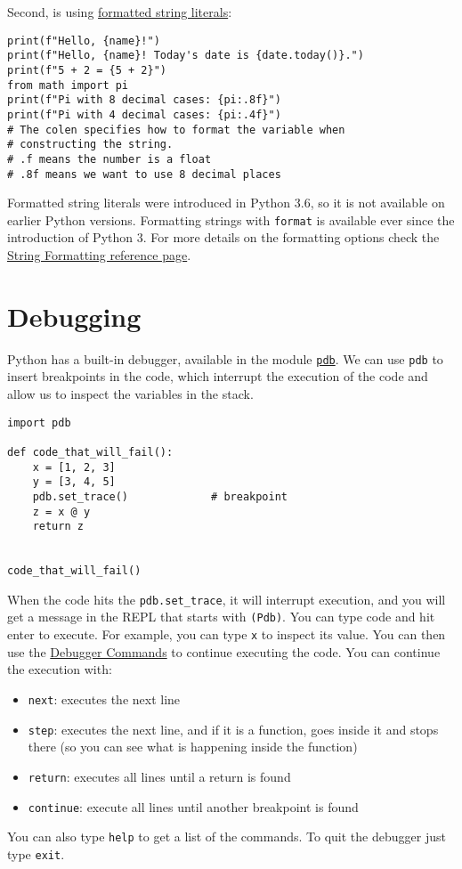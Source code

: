 \documentclass[12pt, a4paper]{article}
\begin{document}
Second, is using \href{https://docs.python.org/3/reference/lexical\_analysis.html\#f-strings}{formatted string literals}:
\lstset{language=jupyter-python,label= ,caption= ,captionpos=b,numbers=none}
\begin{lstlisting}
print(f"Hello, {name}!")
print(f"Hello, {name}! Today's date is {date.today()}.")
print(f"5 + 2 = {5 + 2}")
from math import pi
print(f"Pi with 8 decimal cases: {pi:.8f}")
print(f"Pi with 4 decimal cases: {pi:.4f}")
# The colen specifies how to format the variable when
# constructing the string.
# .f means the number is a float
# .8f means we want to use 8 decimal places
\end{lstlisting}
Formatted string literals were introduced in Python 3.6, so it is not available on earlier Python versions.
Formatting strings with \texttt{format} is available ever since the introduction of Python 3.
For more details on the formatting options check the \href{https://docs.python.org/3/library/stdtypes.html\#printf-style-string-formatting}{String Formatting reference page}.
\section{Debugging}
\label{sec:org172b83a}
Python has a built-in debugger, available in the module \href{https://docs.python.org/3.6/library/pdb.html}{\texttt{pdb}}.
We can use \texttt{pdb} to insert breakpoints in the code, which interrupt the execution of the code and allow us to inspect the variables in the stack.
\lstset{language=jupyter-python,label= ,caption= ,captionpos=b,numbers=none}
\begin{lstlisting}
import pdb

def code_that_will_fail():
    x = [1, 2, 3]
    y = [3, 4, 5]
    pdb.set_trace()             # breakpoint
    z = x @ y
    return z


code_that_will_fail()
\end{lstlisting}
When the code hits the \texttt{pdb.set\_trace}, it will interrupt execution, and you will get a message in the REPL that starts with \texttt{(Pdb)}.
You can type code and hit enter to execute.
For example, you can type \texttt{x} to inspect its value.
You can then use the \href{https://docs.python.org/3.6/library/pdb.html\#debugger-commands}{Debugger Commands} to continue executing the code.
You can continue the execution with:
\begin{itemize}
\item \texttt{next}: executes the next line
\item \texttt{step}: executes the next line, and if it is a function, goes inside it and stops there (so you can see what is happening inside the function)
\item \texttt{return}: executes all lines until a return is found
\item \texttt{continue}: execute all lines until another breakpoint is found
\end{itemize}
You can also type \texttt{help} to get a list of the commands.
To quit the debugger just type \texttt{exit}.
\end{document}
